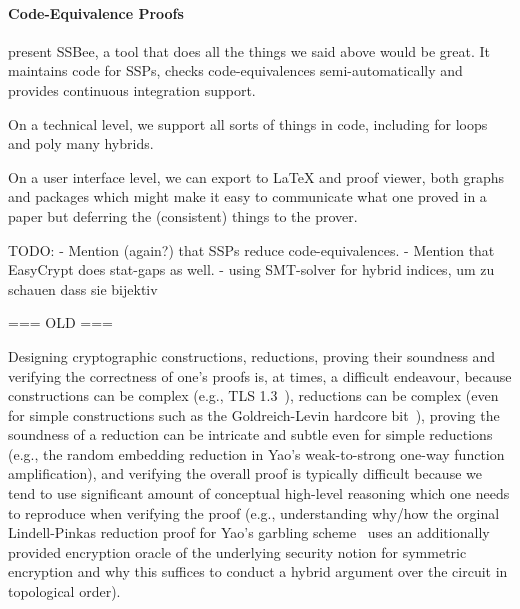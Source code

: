\paragraph{Code-Equivalence Proofs}






present SSBee, a tool that does all the things
we said above would be great. It maintains code for SSPs, checks code-equivalences
semi-automatically and provides continuous integration support.

On a technical level, we support all sorts of things in code, including for loops
and poly many hybrids.

On a user interface level, we can export to LaTeX and proof viewer, both graphs and packages which might make it easy to communicate what one proved in a paper but
deferring the (consistent) things to the prover.















TODO:
- Mention (again?) that SSPs reduce code-equivalences.
- Mention that EasyCrypt does stat-gaps as well. 
- using SMT-solver for hybrid indices, um zu schauen dass sie bijektiv




\iffalse
=== OLD ===

Designing cryptographic constructions, reductions, proving their soundness and verifying the correctness of one's proofs is, at times, a difficult endeavour, because constructions can be complex (e.g., TLS 1.3~\cite{X}), reductions can be complex (even for simple constructions such as the Goldreich-Levin hardcore bit~\cite{X}), proving the soundness of a reduction can be intricate and subtle even for simple reductions (e.g., the random embedding reduction in Yao's weak-to-strong one-way function amplification), and verifying the overall proof is typically difficult because we tend to use significant amount of conceptual high-level reasoning which one needs to reproduce when verifying the proof (e.g., understanding why/how the orginal Lindell-Pinkas reduction proof for Yao's garbling scheme~\cite{X} uses an additionally provided encryption oracle of the underlying security notion for symmetric encryption and why this suffices to conduct a hybrid argument over the circuit in topological order).

